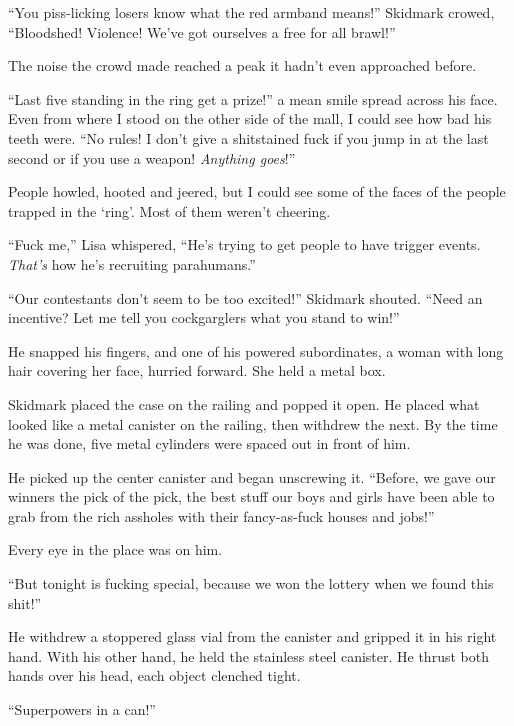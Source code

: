 ``You piss-licking losers know what the red armband means!'' Skidmark crowed, ``Bloodshed!  Violence!  We've got ourselves a free for all brawl!''



The noise the crowd made reached a peak it hadn't even approached before.



``Last five standing in the ring get a prize!'' a mean smile spread across his face.  Even from where I stood on the other side of the mall, I could see how bad his teeth were.  ``No rules!  I don't give a shitstained fuck if you jump in at the last second or if you use a weapon!  \emph{Anything goes}!''



People howled, hooted and jeered, but I could see some of the faces of the people trapped in the `ring'.  Most of them weren't cheering.



``Fuck me,'' Lisa whispered, ``He's trying to get people to have trigger events.  \emph{That's} how he's recruiting parahumans.''



``Our contestants don't seem to be too excited!'' Skidmark shouted.  ``Need an incentive?  Let me tell you cockgarglers what you stand to win!''



He snapped his fingers, and one of his powered subordinates, a woman with long hair covering her face, hurried forward.  She held a metal box.



Skidmark placed the case on the railing and popped it open.  He placed what looked like a metal canister on the railing, then withdrew the next.  By the time he was done, five metal cylinders were spaced out in front of him.



He picked up the center canister and began unscrewing it.  ``Before, we gave our winners the pick of the pick, the best stuff our boys and girls have been able to grab from the rich assholes with their fancy-as-fuck houses and jobs!''



Every eye in the place was on him.



``But tonight is fucking special, because we won the lottery when we found this shit!''



He withdrew a stoppered glass vial from the canister and gripped it in his right hand.  With his other hand, he held the stainless steel canister.  He thrust both hands over his head, each object clenched tight.



``Superpowers in a can!''





